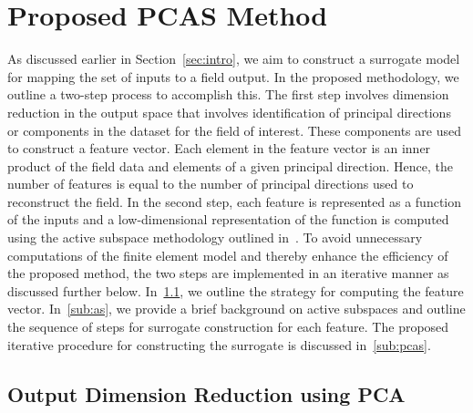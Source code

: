 \section{Proposed PCAS Method}
\label{sec:method}

As discussed earlier in Section~\ref{sec:intro}, we aim to construct a surrogate model for mapping the set of inputs to a
field output. In the proposed methodology, we outline a two-step process to accomplish this. The first step involves
dimension reduction in the output space that involves
identification of principal directions or components in the dataset for the field of interest. These components are used
to construct a feature vector. Each element in the feature vector is an inner product of the field data and elements
of a given principal direction. Hence, the number of features is equal to the number of principal directions used to
reconstruct the field. In the second step, each feature is represented as a function of the inputs and a low-dimensional
representation of the function is computed
using the active subspace methodology outlined in~\cite{Constantine:2015}. 
To avoid unnecessary computations of the finite element model and thereby enhance the efficiency of the proposed method,
the two steps are implemented in an iterative manner as discussed further below. 
In~\ref{sub:pca}, we outline
the strategy for computing the feature vector. In~\ref{sub:as}, we provide a brief background on active subspaces
and outline the sequence of steps for surrogate construction for each feature. The proposed iterative procedure for
constructing the surrogate is discussed in~\ref{sub:pcas}.

\subsection{Output Dimension Reduction using PCA}
\label{sub:pca}

